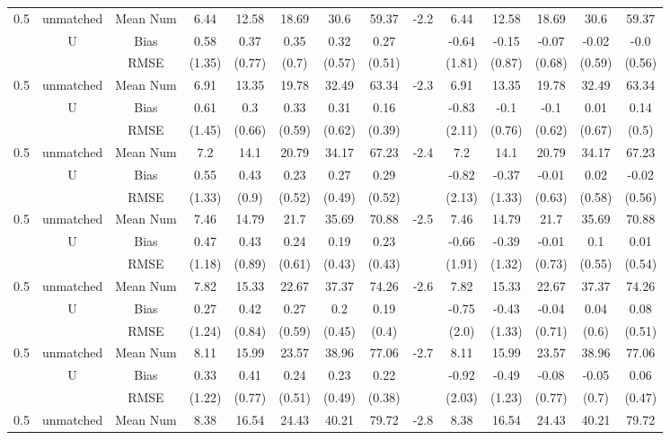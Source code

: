 \begin{tabular}{@{\extracolsep{5pt}}lc|cccccc|lccccc}
0.5 & unmatched & Mean Num & 6.44 & 12.58 & 18.69 & 30.6 & 59.37 & -2.2 & 6.44 & 12.58 & 18.69 & 30.6 & 59.37 \\
 & U & Bias & 0.58 & 0.37 & 0.35 & 0.32 & 0.27 &  & -0.64 & -0.15 & -0.07 & -0.02 & -0.0 \\
 &  & RMSE & (1.35) & (0.77) & (0.7) & (0.57) & (0.51) &  & (1.81) & (0.87) & (0.68) & (0.59) & (0.56) \\
0.5 & unmatched & Mean Num & 6.91 & 13.35 & 19.78 & 32.49 & 63.34 & -2.3 & 6.91 & 13.35 & 19.78 & 32.49 & 63.34 \\
 & U & Bias & 0.61 & 0.3 & 0.33 & 0.31 & 0.16 &  & -0.83 & -0.1 & -0.1 & 0.01 & 0.14 \\
 &  & RMSE & (1.45) & (0.66) & (0.59) & (0.62) & (0.39) &  & (2.11) & (0.76) & (0.62) & (0.67) & (0.5) \\
0.5 & unmatched & Mean Num & 7.2 & 14.1 & 20.79 & 34.17 & 67.23 & -2.4 & 7.2 & 14.1 & 20.79 & 34.17 & 67.23 \\
 & U & Bias & 0.55 & 0.43 & 0.23 & 0.27 & 0.29 &  & -0.82 & -0.37 & -0.01 & 0.02 & -0.02 \\
 &  & RMSE & (1.33) & (0.9) & (0.52) & (0.49) & (0.52) &  & (2.13) & (1.33) & (0.63) & (0.58) & (0.56) \\
0.5 & unmatched & Mean Num & 7.46 & 14.79 & 21.7 & 35.69 & 70.88 & -2.5 & 7.46 & 14.79 & 21.7 & 35.69 & 70.88 \\
 & U & Bias & 0.47 & 0.43 & 0.24 & 0.19 & 0.23 &  & -0.66 & -0.39 & -0.01 & 0.1 & 0.01 \\
 &  & RMSE & (1.18) & (0.89) & (0.61) & (0.43) & (0.43) &  & (1.91) & (1.32) & (0.73) & (0.55) & (0.54) \\
0.5 & unmatched & Mean Num & 7.82 & 15.33 & 22.67 & 37.37 & 74.26 & -2.6 & 7.82 & 15.33 & 22.67 & 37.37 & 74.26 \\
 & U & Bias & 0.27 & 0.42 & 0.27 & 0.2 & 0.19 &  & -0.75 & -0.43 & -0.04 & 0.04 & 0.08 \\
 &  & RMSE & (1.24) & (0.84) & (0.59) & (0.45) & (0.4) &  & (2.0) & (1.33) & (0.71) & (0.6) & (0.51) \\
0.5 & unmatched & Mean Num & 8.11 & 15.99 & 23.57 & 38.96 & 77.06 & -2.7 & 8.11 & 15.99 & 23.57 & 38.96 & 77.06 \\
 & U & Bias & 0.33 & 0.41 & 0.24 & 0.23 & 0.22 &  & -0.92 & -0.49 & -0.08 & -0.05 & 0.06 \\
 &  & RMSE & (1.22) & (0.77) & (0.51) & (0.49) & (0.38) &  & (2.03) & (1.23) & (0.77) & (0.7) & (0.47) \\
0.5 & unmatched & Mean Num & 8.38 & 16.54 & 24.43 & 40.21 & 79.72 & -2.8 & 8.38 & 16.54 & 24.43 & 40.21 & 79.72 \\

\end{tabular}
